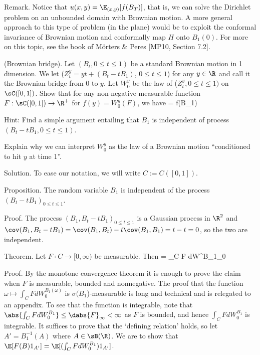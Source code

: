 Remark. Notice that $u(x, y) = \E_{(x,y)}[f(B_T)]$, that is, we can solve the Dirichlet problem on an unbounded domain with Brownian motion. A more general approach to this type of problem (in the plane) would be to exploit the conformal invariance of Brownian motion and conformally map $H$ onto $B_1(0)$. For more on this topic, see the book of M\"orters \& Peres [MP10, Section 7.2].

\vspace{2mm}

\qcutline


\item (Brownian bridge). Let $(B_t, 0 \leq t \leq 1)$ be a standard Brownian motion in 1 dimension. We let ($Z^y_t = yt + (B_t - tB_1)$, $0 \leq t \leq 1$) for any $y \in \R$ and call it the Brownian bridge from 0 to $y$. Let $W^y_0$ be the law of ($Z^y_t , 0 \leq t \leq 1)$ on $\sC([0, 1])$. Show that for any
non-negative measurable function $F : \sC([0, 1]) \to \R^+$ for $f(y) = W^y_0 (F)$, we have
\be
\E[F(B)|B_1] = f(B_1)
\ee

Hint: Find a simple argument entailing that $B_1$ is independent of process $(B_t -tB_1, 0 \leq t \leq 1)$.

Explain why we can interpret $W^y_0$ as the law of a Brownian motion ``conditioned to hit $y$ at time 1''.

\scutline

Solution. To ease our notation, we will write $C := C([0, 1])$.

Proposition. The random variable $B_1$ is independent of the process $(B_t - tB_1)_{0\leq t\leq 1}$.

Proof. The process $(B_1, B_t - tB_1)_{0\leq t\leq 1}$ is a Gaussian process in $\R^2$ and $\cov(B_1, B_t - tB_1) = \cov(B_1, B_t) - t\cov(B_1, B_1) = t - t = 0$, so the two are independent.

Theorem. Let $F ∶ C \to [0, \infty)$ be measurable. Then
\be
\E[F(B)|B_1] = \int_C F dW^{B_1}_0 
\ee

Proof. By the monotone convergence theorem it is enough to prove the claim when $F$ is measurable, bounded and nonnegative. The proof that the function $\omega \mapsto \int_C F dW^{B_1(\omega)}_0$ is $\sigma(B_1$)-measurable is long and technical and is relegated to an appendix. To see that the function is integrable, note that $\abs{ \int_C F dW^{B_1}_0} \leq \dabs{F}_\infty < \infty$ as $F$ is bounded, and hence $\int_C F dW^{B_1}_0$ is integrable. It suffices to prove that the `defining relation' holds, so let $A' = B^{-1}_1 (A)$ where $A \in \sB(\R)$. We are to show that $\E[F(B)1_{A'}] = \E[(\int_C F dW^{B_1}_0 )1_{A'}]$.

